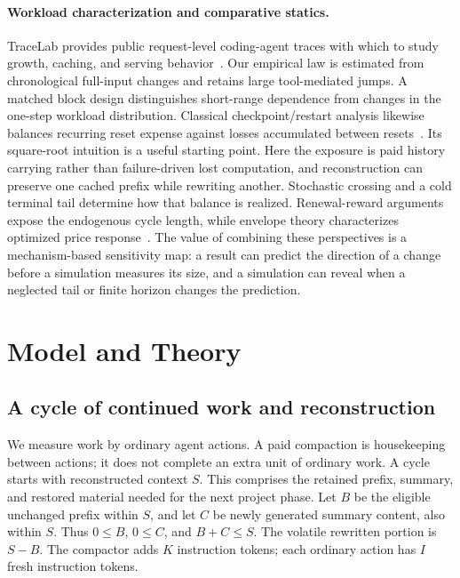 \documentclass[sigconf,screen,nonacm]{acmart}
\begin{document}
\paragraph{Workload characterization and comparative statics.}
TraceLab provides public request-level coding-agent traces with which to study
growth, caching, and serving behavior~\cite{tracelab}. Our empirical law is
estimated from chronological full-input changes and retains large tool-mediated
jumps. A matched block design distinguishes short-range dependence from
changes in the one-step workload distribution. Classical checkpoint/restart
analysis likewise balances recurring reset expense against losses accumulated
between resets~\cite{daly}. Its square-root intuition is a useful starting
point. Here the exposure is paid history carrying rather than failure-driven
lost computation, and reconstruction can preserve one cached prefix while
rewriting another. Stochastic crossing and a cold terminal tail determine how
that balance is realized. Renewal-reward arguments expose the endogenous
cycle length, while envelope
theory characterizes optimized price response~\cite{milgrom}. The value of
combining these perspectives is a mechanism-based sensitivity map: a result
can predict the direction of a change before a simulation measures its size,
and a simulation can reveal when a neglected tail or finite horizon changes
the prediction.

\section{Model and Theory}
\label{sec:theory}

\subsection{A cycle of continued work and reconstruction}
\label{sec:cycle}

We measure work by ordinary agent actions. A paid compaction is housekeeping
between actions; it does not complete an extra unit of ordinary work. A cycle
starts with reconstructed context $S$. This comprises the retained prefix,
summary, and restored material needed for the next project phase. Let $B$
be the eligible unchanged prefix within $S$, and let $C$ be newly generated
summary content, also within $S$. Thus $0\le B$, $0\le C$, and $B+C\le S$.
The volatile rewritten portion is $S-B$. The compactor adds $K$ instruction
tokens; each ordinary action has $I$ fresh instruction tokens.
\end{document}
